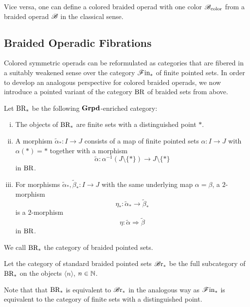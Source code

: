 \begin{rem} Vice versa, one can define a colored braided operad with one color
    $\mathscr{B}_{\text{color}}$ from a braided operad $\mathscr{B}$ in the classical sense. 
\end{rem}


\subsection{Braided Operadic Fibrations}

Colored symmetric operads can be reformulated as categories that are fibered in
a suitably weakened sense over the category $\mathscr{F} \text{in}_{\ast}$ of finite pointed sets. In
order to develop an analogous perspective for colored braided operads, we now
introduce a pointed variant of the category $\operatorname{BR}$ of braided sets from above. 

\begin{defin}
    Let $\operatorname{BR_{\ast}}$ be the following $\operatorname{\textbf{Grpd}}$-enriched category:
    \begin{enumerate}[(i)]
        \item The objects of $\operatorname{BR_{\ast}}$ are finite sets with a distinguished point
        $\ast$.
        \item A morphism $\widetilde{\alpha}_{\ast} \colon I \to J$ consists of
        a map of finite pointed sets $\alpha \colon I \to J$ with
        $\alpha(\ast)=\ast$ together with a morphism
        \[
            \widetilde{\alpha} \colon \alpha^{-1}(J \setminus \{\ast\}) \to J \setminus \{\ast\}
        \]
        in $\operatorname{BR}$.
        \item For morphisms $\widetilde{\alpha}_{\ast}, \widetilde{\beta}_{\ast}
        \colon I \to J$ with the same underlying map $\alpha = \beta$, a
        $2$-morphism 
        $$\eta_{\ast} \colon \widetilde{\alpha}_{\ast} \to
        \widetilde{\beta}_{\ast}$$ is a $2$-morphism 
        $$\eta \colon \widetilde{\alpha} \Rightarrow \widetilde{\beta}$$ in
        $\operatorname{BR}$.
    \end{enumerate}
    We call $\operatorname{BR_{\ast}}$ the category of braided pointed sets.
\end{defin}

\begin{defin}
    Let the category of standard braided pointed sets $\mathscr{B} \text{r}_{\ast}$ be the full
    subcategory of $\operatorname{BR_{\ast}}$ on the objects $\langle n \rangle$, $n \in \mathbb{N}$.
\end{defin}

\begin{rem}
    Note that that $\operatorname{BR_{\ast}}$ is equivalent to $\mathscr{B} \text{r}_{\ast}$ in the analogous way as $\mathscr{F} \text{in}_{\ast}$
    is equivalent to the category of finite sets with a distinguished point.
\end{rem}


